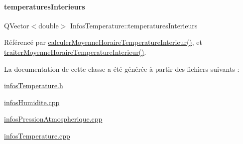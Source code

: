 \paragraph{\texorpdfstring{temperatures\+Interieurs}{temperaturesInterieurs}}
{\footnotesize\ttfamily Q\+Vector$<$double$>$ Infos\+Temperature\+::temperatures\+Interieurs\hspace{0.3cm}{\ttfamily [private]}}



Référencé par \hyperlink{class_infos_temperature_a8cb8b9bef07506019ea6c9d91809af87}{calculer\+Moyenne\+Horaire\+Temperature\+Interieur()}, et \hyperlink{class_infos_temperature_a0311c8ce5730388f3baef752920d5abf}{traiter\+Moyenne\+Horaire\+Temperature\+Interieur()}.



La documentation de cette classe a été générée à partir des fichiers suivants \+:\begin{DoxyCompactItemize}
\item 
\hyperlink{infos_temperature_8h}{infos\+Temperature.\+h}\item 
\hyperlink{infos_humidite_8cpp}{infos\+Humidite.\+cpp}\item 
\hyperlink{infos_pression_atmospherique_8cpp}{infos\+Pression\+Atmospherique.\+cpp}\item 
\hyperlink{infos_temperature_8cpp}{infos\+Temperature.\+cpp}\end{DoxyCompactItemize}
